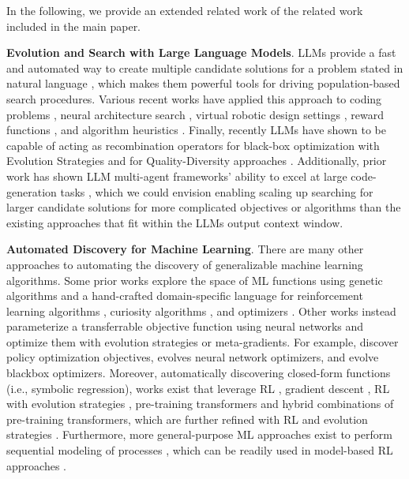 \documentclass{article}
\theoremstyle{plain}
\theoremstyle{definition}
\theoremstyle{remark}
\begin{document}
In the following, we provide an extended related work of the related work included in the main paper.

\textbf{Evolution and Search with Large Language Models}. LLMs provide a fast and automated way to create multiple candidate solutions for a problem stated in natural language \citep{song2024position}, which makes them powerful tools for driving population-based search procedures. Various recent works have applied this approach to coding problems \citep{romera2024mathematical}, neural architecture search \citep{chen2024evoprompting,holt2024learning,holt2024datadriven}, virtual robotic design settings \citep{lehman2023evolution}, reward functions \citep{ma2023eureka, yu2023language}, and algorithm heuristics \citep{liu2024evolution}. Finally, recently LLMs have shown to be capable of acting as recombination operators for black-box optimization with Evolution Strategies \citep{lange2024large} and for Quality-Diversity approaches \citep{lim2024large}. Additionally, prior work has shown LLM multi-agent frameworks' ability to excel at large code-generation tasks \citep{holt2024lmac}, which we could envision enabling scaling up searching for larger candidate solutions for more complicated objectives or algorithms than the existing approaches that fit within the LLMs output context window.


\textbf{Automated Discovery for Machine Learning}. 
There are many other approaches to automating the discovery of generalizable machine learning algorithms. Some prior works explore the space of ML functions using genetic algorithms and a hand-crafted domain-specific language for reinforcement learning algorithms \citep{co2021evolving}, curiosity algorithms \citep{alet2020meta}, and optimizers \citep{chen2024symbolic}. Other works instead parameterize a transferrable objective function using neural networks and optimize them with evolution strategies or meta-gradients. For example, \citet{lu2022discovered, jackson2024discovering, houthooft2018evolved, alfano2024meta, kirsch2019improving, oh2020discovering, jackson2024groove} discover policy optimization objectives, \citet{metz2022velo} evolves neural network optimizers, and \citet{lange2023discovering_es, lange2023discovering_ga} evolve blackbox optimizers. Moreover, automatically discovering closed-form functions (i.e., symbolic regression), works exist that leverage RL \citep{petersen2020deep}, gradient descent \citep{kacprzyk2024ode}, RL with evolution strategies \citep{mundhenk2021symbolic}, pre-training transformers \citep{biggio2021neural} and hybrid combinations of pre-training transformers, which are further refined with RL and evolution strategies \citep{holt2023deep}. Furthermore, more general-purpose ML approaches exist to perform sequential modeling of processes \citep{holt2022neural}, which can be readily used in model-based RL approaches \citep{holt2023neural,holt2024active}.
\end{document}
